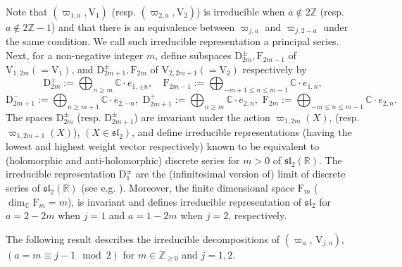 \documentclass[11pt]{article}
\numberwithin{equation}{section}
\newcommand{\Z}{\mathbb{Z}} %
\newcommand{\R}{\mathbb{R}} %
\newcommand{\C}{\mathbb{C}} %
\newcommand{\RpnSymbol}[1]{\bm{\mathrm{#1}}}
\newcommand{\rF}{\RpnSymbol{F}}
\newcommand{\rV}{\RpnSymbol{V}}
\newcommand{\rD}{\RpnSymbol{D}}
\theoremstyle{plain}
\theoremstyle{definition}
\theoremstyle{remark}
\begin{document}
Note that $(\varpi_{1,a},\rV_{1})$ (resp. $(\varpi_{2,a},\rV_{2})$) is irreducible
when $a\not\in 2\Z$ (resp. $a\not\in 2\Z-1$) and that there is an equivalence between
$\varpi_{j,a}$ and $\varpi_{j,2-a}$ under the same condition. We call such irreducible representation a principal series.
Next, for a non-negative integer $m$, define subspaces $\rD^{\pm}_{2m},\rF_{2m-1}$ of
$\rV_{1,2m}(=\rV_{1})$, and  $\rD^{\pm}_{2m+1},\rF_{2m}$ of
$\rV_{2,2m+1}(=\rV_{2})$ respectively by
\begin{equation*}
  \rD^{\pm}_{2m}:=\bigoplus_{n\geq  m}\C\cdot e_{1,\pm n},\quad
  \rF_{2m-1}:=\bigoplus_{-m+1\leq n\leq m-1}\C\cdot e_{1,n},
\end{equation*}
\begin{equation*}
  \rD^{-}_{2m+1}:=\bigoplus_{n\geq m+1}\C\cdot e_{2,-n},\,\,
  \rD^{+}_{2m+1}:=\bigoplus_{n\geq m}\C\cdot e_{2,n},\,\,
  \rF_{2m}:=\bigoplus_{-m\leq n\leq m-1}\C\cdot e_{2,n}.
\end{equation*}
The spaces $\rD^{\pm}_{2m}$ (resp. $\rD^{\pm}_{2m+1}$) are invariant under the action $\varpi_{1,2m}(X)$,  (resp. $\varpi_{1,2m+1}(X)$), $(X\in \mathfrak{sl}_2)$, and define irreducible representations (having the lowest
and highest weight vector respectively) known to be equivalent to (holomorphic and anti-holomorphic) discrete series for $m>0$ of
$\mathfrak{sl}_2(\R)$. The irreducible representation $\rD^{\pm}_{1}$ are the (infinitesimal version of) limit of discrete series of
$\mathfrak{sl}_2(\R)$ (see e.g. \cite{HT1992,L}). Moreover, the finite dimensional space $\rF_{m}$ ($\dim_{\C} \rF_{m}=m$),  is invariant
and defines irreducible representation of $\mathfrak{sl}_2$ for $a=2-2m$ when $j=1$ and $a=1-2m$ when $j=2$, respectively.

The following result describes the irreducible decompositions of \((\varpi_a, \, \rV_{j,a})\), \((a=m\equiv j-1 \mod 2)\) for $m\in \Z_{\geq 0}$ and $j=1,2$.
\end{document}
